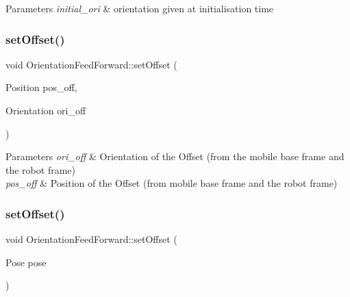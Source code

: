 \begin{DoxyParams}{Parameters}
{\em initial\+\_\+ori} & orientation given at initialisation time \\
\hline
\end{DoxyParams}
\mbox{\label{classOrientationFeedForward_adc105d9a1fe00d6a79fcf38447202709}} 
\subsubsection{\texorpdfstring{set\+Offset()}{setOffset()}\hspace{0.1cm}{\footnotesize\ttfamily [1/2]}}
{\footnotesize\ttfamily void Orientation\+Feed\+Forward\+::set\+Offset (\begin{DoxyParamCaption}\item[{Position}]{pos\+\_\+off,  }\item[{Orientation}]{ori\+\_\+off }\end{DoxyParamCaption})}


\begin{DoxyParams}{Parameters}
{\em ori\+\_\+off} & Orientation of the Offset (from the mobile base frame and the robot frame) \\
\hline
{\em pos\+\_\+off} & Position of the Offset (from mobile base frame and the robot frame) \\
\hline
\end{DoxyParams}
\mbox{\label{classOrientationFeedForward_adbd1691b1e930752818624d065acbf1c}} 
\subsubsection{\texorpdfstring{set\+Offset()}{setOffset()}\hspace{0.1cm}{\footnotesize\ttfamily [2/2]}}
{\footnotesize\ttfamily void Orientation\+Feed\+Forward\+::set\+Offset (\begin{DoxyParamCaption}\item[{Pose}]{pose }\end{DoxyParamCaption})}


